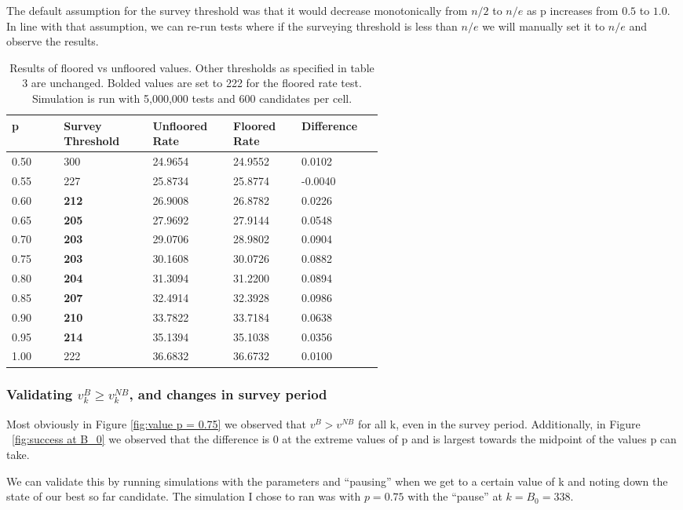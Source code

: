 \documentclass[a4paper,11pt]{article}
\begin{document}
The default assumption for the survey threshold was that it would decrease monotonically from $n/2$ to $n/e$ as p increases from $0.5$ to $1.0$. In line with that assumption, we can re-run tests where if the surveying threshold is less than $n/e$ we will manually set it to $n/e$ and observe the results.
\begin{table}[h]
\centering
\begin{tabular}
{|p{0.10\linewidth}|p{0.15\linewidth}|p{0.10\linewidth}|p{0.10\linewidth}|p{0.10\linewidth}|}
\hline
p&Survey Threshold &Unfloored Rate&Floored Rate&Difference\\
\hline
0.50 & 300 & 24.9654 & 24.9552 & 0.0102 \\
0.55 & 227& 25.8734 & 25.8774 & -0.0040 \\
0.60 & \textbf{212}& 26.9008 & 26.8782 & 0.0226 \\
0.65 & \textbf{205} & 27.9692 & 27.9144 & 0.0548 \\
0.70 & \textbf{203} & 29.0706 & 28.9802 & 0.0904 \\
0.75 & \textbf{203} & 30.1608 & 30.0726 & 0.0882 \\
0.80 & \textbf{204} & 31.3094 & 31.2200 & 0.0894 \\
0.85 & \textbf{207} & 32.4914 & 32.3928 & 0.0986 \\
0.90 & \textbf{210} & 33.7822 & 33.7184 & 0.0638 \\
0.95 & \textbf{214} & 35.1394 & 35.1038 & 0.0356 \\
1.00 & 222 & 36.6832 & 36.6732 & 0.0100 \\
\hline
\end{tabular}
\caption{Results of floored vs unfloored values. Other thresholds as specified in table 3 are unchanged. Bolded values are set to 222 for the floored rate test. Simulation is run with 5,000,000 tests and 600 candidates per cell.}
\end{table}
\subsubsection{Validating $v_k^B \ge v_k^{NB}$, and changes in survey period}

Most obviously in Figure \ref{fig:value p = 0.75} we observed that $v^B > v^{NB}$ for all k, even in the survey period. Additionally, in Figure ~\ref{fig:success at B_0} we observed that the difference is 0 at the extreme values of p and is largest towards the midpoint of the values p can take.

We can validate this by running simulations with the parameters and ``pausing'' when we get to a certain value of k and noting down the state of our best so far candidate. The simulation I chose to ran was with $p=0.75$ with the ``pause'' at $k = B_0 = 338$. 
\end{document}
